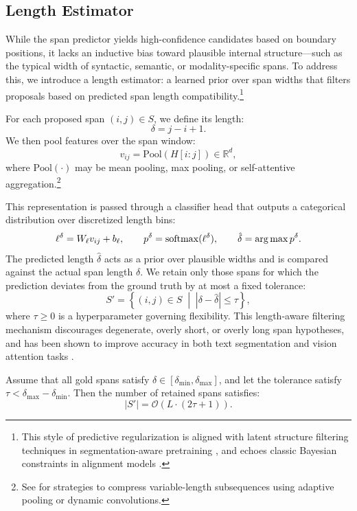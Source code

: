 \subsection{Length Estimator}

While the span predictor yields high-confidence candidates based on boundary positions, it lacks an inductive bias toward plausible internal structure—such as the typical width of syntactic, semantic, or modality-specific spans. To address this, we introduce a length estimator: a learned prior over span widths that filters proposals based on predicted span length compatibility.\footnote{This style of predictive regularization is aligned with latent structure filtering techniques in segmentation-aware pretraining \cite{liu2022learnedsegmentation, liu2022pmlm}, and echoes classic Bayesian constraints in alignment models \cite{kreutzer2021distilling}.}

\medskip
\noindent
For each proposed span \((i,j) \in S\), we define its length:
\[
  \delta = j - i + 1.
\]
We then pool features over the span window:
\[
  v_{ij} = \mathrm{Pool}(H[i{:}j]) \in \mathbb{R}^d,
\]
where \(\mathrm{Pool}(\cdot)\) may be mean pooling, max pooling, or self-attentive aggregation.\footnote{See \cite{liu2018genius, tay2021charformer} for strategies to compress variable-length subsequences using adaptive pooling or dynamic convolutions.}

This representation is passed through a classifier head that outputs a categorical distribution over discretized length bins:
\[
  \ell^\delta = W_\ell v_{ij} + b_\ell,
  \qquad
  p^\delta = \mathrm{softmax}(\ell^\delta),
  \qquad
  \hat\delta = \arg\max p^\delta.
\]
The predicted length \(\hat\delta\) acts as a prior over plausible widths and is compared against the actual span length \(\delta\). We retain only those spans for which the prediction deviates from the ground truth by at most a fixed tolerance:
\[
  S' = \left\{ (i,j) \in S \;\middle|\; |\delta - \hat\delta| \le \tau \right\},
\]
where \(\tau \geq 0\) is a hyperparameter governing flexibility. This length-aware filtering mechanism discourages degenerate, overly short, or overly long span hypotheses, and has been shown to improve accuracy in both text segmentation and vision attention tasks \cite{cheng2021masked, vinyals2015pointer, zach2019segmenter}.

\begin{proposition}
Assume that all gold spans satisfy \(\delta \in [\delta_{\min}, \delta_{\max}]\), and let the tolerance satisfy \(\tau < \delta_{\max} - \delta_{\min}\). Then the number of retained spans satisfies:
\[
  |S'| = \mathcal{O}\left(L \cdot (2\tau + 1)\right).
\]
\end{proposition}

